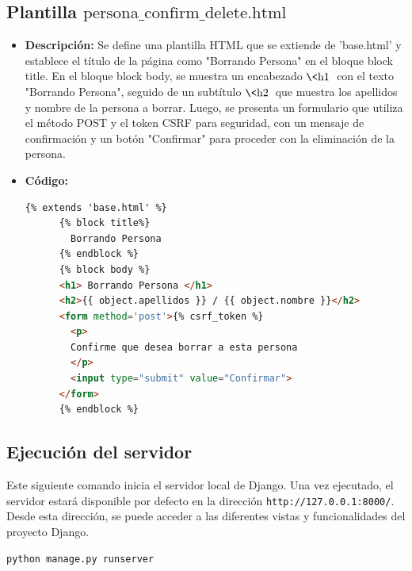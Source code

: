 \documentclass{article}
\begin{document}

  \subsection{Plantilla $\text{persona\_confirm\_delete.html}$}
  \begin{itemize}
    \item \textbf{Descripción: }Se define una plantilla HTML que se extiende de 'base.html' y establece el título de la 
    página como "Borrando Persona" en el bloque block title. En el bloque block body, 
    se muestra un encabezado $\text{\<h1\>}$ con el texto "Borrando Persona", seguido de un subtítulo $\text{\<h2\>}$ que muestra 
    los apellidos y nombre de la persona a borrar. Luego, se presenta un formulario que utiliza el método POST 
    y el token CSRF para seguridad, con un mensaje de confirmación y un botón "Confirmar" para proceder con la 
    eliminación de la persona.
    \item \textbf{Código: }
    \begin{lstlisting}[language=html]
      {% extends 'base.html' %}
      {% block title%}
        Borrando Persona
      {% endblock %}
      {% block body %}
      <h1> Borrando Persona </h1>
      <h2>{{ object.apellidos }} / {{ object.nombre }}</h2>
      <form method='post'>{% csrf_token %}
        <p>
        Confirme que desea borrar a esta persona
        </p>
        <input type="submit" value="Confirmar">
      </form>
      {% endblock %}
    \end{lstlisting}   
  \end{itemize}
  

  \subsection{Ejecución del servidor}
  Este siguiente comando inicia el servidor local de Django. Una vez ejecutado, el servidor estará disponible por defecto en la dirección 
  \texttt{http://127.0.0.1:8000/}. Desde esta dirección, se puede acceder a las diferentes vistas y funcionalidades del 
  proyecto Django.
  \begin{lstlisting}[language=bash]
    python manage.py runserver
  \end{lstlisting}

\end{document}
